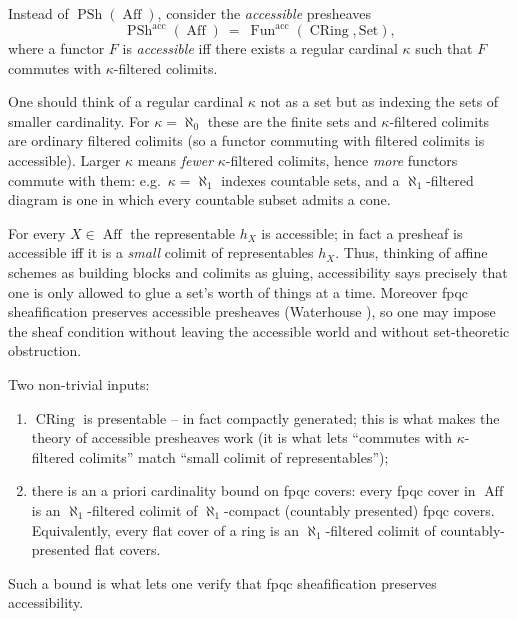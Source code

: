 \begin{definition}
\label{def:15:accessible}
Instead of $\operatorname{PSh}(\operatorname{Aff})$, consider the \emph{accessible}
presheaves
\begin{equation*}
\operatorname{PSh}^{\mathrm{acc}}(\operatorname{Aff})\ =\ \operatorname{Fun}^{\mathrm{acc}}(\operatorname{CRing}, \mathrm{Set}),
\end{equation*}
where a functor $F$ is \emph{accessible} iff there exists a regular cardinal $\kappa$
such that $F$ commutes with $\kappa$-filtered colimits.
\end{definition}

\begin{remark}
\label{rmk:15:reading-kappa}
One should think of a regular cardinal $\kappa$ not as a set but as indexing the sets
of smaller cardinality. For $\kappa = \aleph_0$ these are the finite sets and
$\kappa$-filtered colimits are ordinary filtered colimits (so a functor commuting with
filtered colimits is accessible). Larger $\kappa$ means \emph{fewer} $\kappa$-filtered
colimits, hence \emph{more} functors commute with them: e.g.\ $\kappa=\aleph_1$ indexes
countable sets, and a $\aleph_1$-filtered diagram is one in which every countable
subset admits a cone.
\end{remark}

\begin{remark}[Accessible $=$ small colimit of representables]
\label{rmk:15:accessible-representable}
For every $X\in\operatorname{Aff}$ the representable $h_X$ is accessible; in fact a
presheaf is accessible iff it is a \emph{small} colimit of representables $h_X$. Thus,
thinking of affine schemes as building blocks and colimits as gluing, accessibility
says precisely that one is only allowed to glue a set's worth of things at a time.
Moreover fpqc sheafification preserves accessible presheaves (Waterhouse
\cite{Waterhouse_1975}), so one may impose the sheaf condition without leaving the
accessible world and without set-theoretic obstruction.
\end{remark}

\begin{remark}
\label{rmk:15:what-works}
Two non-trivial inputs:
\begin{enumerate}
\item $\operatorname{CRing}$ is presentable -- in fact compactly generated; this is what
makes the theory of accessible presheaves work (it is what lets ``commutes with
$\kappa$-filtered colimits'' match ``small colimit of representables'');
\item there is an a priori cardinality bound on fpqc covers: every fpqc cover in
$\operatorname{Aff}$ is an $\aleph_1$-filtered colimit of $\aleph_1$-compact
(countably presented) fpqc covers. Equivalently, every flat cover of a ring is an
$\aleph_1$-filtered colimit of countably-presented flat covers.
\end{enumerate}
Such a bound is what lets one verify that fpqc sheafification preserves accessibility.
\end{remark}

